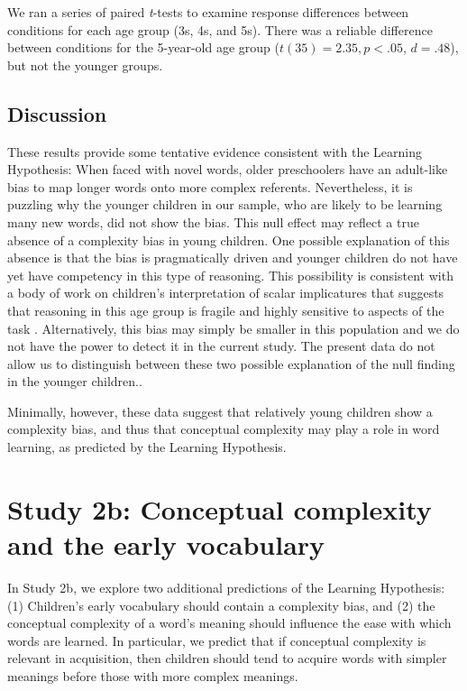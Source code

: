 We  ran a series of paired {\it t}-tests to examine response differences between conditions for each age group (3s, 4s, and 5s). There was a reliable difference between conditions for the 5-year-old age group ($t(35) =2.35, p<.05$, $d=.48$), but not the younger groups. 

\subsection{Discussion}
These results provide some tentative evidence consistent with the Learning Hypothesis: When faced with novel words, older  preschoolers have an adult-like bias to map longer words onto more complex referents. Nevertheless, it is puzzling why the younger children in our sample, who are likely to be learning many new words, did not show the bias. This null effect may reflect a true absence of a complexity bias in young children. One possible explanation of this absence is that the bias is pragmatically driven and younger children do not have yet have competency in this type of reasoning. This possibility is consistent with a body of work on children's interpretation of scalar implicatures that suggests that reasoning in this age group is fragile and highly sensitive to aspects of the task \cite<for a review, see>{horowitz2016the-trouble}. Alternatively, this bias may simply be smaller in this population and we do not have the power to detect it in the current study. The present data do not allow us to distinguish between these two possible explanation of the null finding in the younger children.. 

Minimally, however, these data  suggest that relatively young children show a complexity bias, and thus that conceptual complexity may play a role in word learning,  as predicted by the Learning Hypothesis.

\section{Study 2b: Conceptual complexity and the early vocabulary}
In Study 2b, we explore two additional predictions of the Learning Hypothesis:  (1) Children's early vocabulary should contain a complexity bias, and (2) the conceptual complexity of a word's meaning should influence the ease with which words are learned. In particular, we predict that if conceptual complexity is relevant in acquisition, then children should tend to acquire words with simpler meanings before those with more complex meanings.


